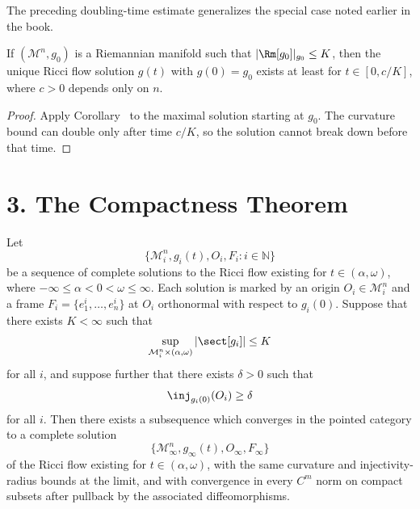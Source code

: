 \begin{remark}
\label{ch07-rem-special-case-doubling-time}

The preceding doubling-time estimate generalizes the special case noted earlier in the book.
\end{remark}

\begin{corollary}
\label{ch07-cor-minimal-existence-time}

If \((\mathcal M^n,g_0)\) is a Riemannian manifold such that \(|\Rm[g_0]|_{g_0}\le K\), then the unique Ricci flow solution \(g(t)\) with \(g(0)=g_0\) exists at least for \(t\in[0,c/K]\), where \(c>0\) depends only on \(n\).
\end{corollary}

\begin{proof}
\sketch Apply Corollary~ to the maximal solution starting at \(g_0\). The curvature bound can double only after time \(c/K\), so the solution cannot break down before that time.
\end{proof}

\section*{3. The Compactness Theorem}

\begin{theorem}
\label{ch07-thm-compactness-theorem}

Let
\[
\{\mathcal M_i^n,g_i(t),O_i,F_i:i\in\mathbb N\}
\]
be a sequence of complete solutions to the Ricci flow existing for \(t\in(\alpha,\omega)\), where \(-\infty\le \alpha<0<\omega\le\infty\). Each solution is marked by an origin \(O_i\in \mathcal M_i^n\) and a frame \(F_i=\{e_1^i,\dots,e_n^i\}\) at \(O_i\) orthonormal with respect to \(g_i(0)\). Suppose that there exists \(K<\infty\) such that
\[
\sup_{\mathcal M_i^n\times(\alpha,\omega)}|\sect[g_i]|\le K
\]
for all \(i\), and suppose further that there exists \(\delta>0\) such that
\[
\inj_{g_i(0)}(O_i)\ge \delta
\]
for all \(i\). Then there exists a subsequence which converges in the pointed category to a complete solution
\[
\{\mathcal M_\infty^n,g_\infty(t),O_\infty,F_\infty\}
\]
of the Ricci flow existing for \(t\in(\alpha,\omega)\), with the same curvature and injectivity-radius bounds at the limit, and with convergence in every \(C^m\) norm on compact subsets after pullback by the associated diffeomorphisms.
\end{theorem}

